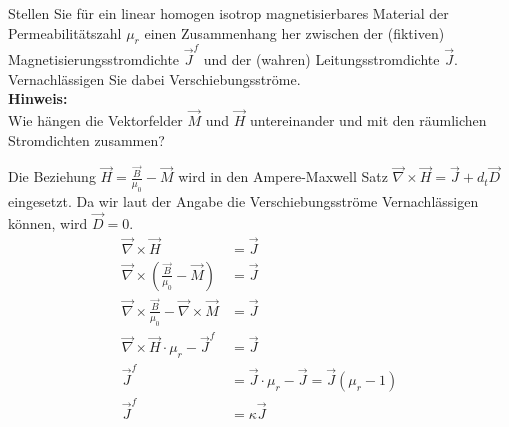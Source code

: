 \begin{question}[section=2,subsection=21,name={Wahre und fiktive Stromdichte},difficulty=2,type=bsp,mode=skp,tags={20161207}]
	Stellen Sie für ein linear homogen isotrop magnetisierbares Material der Permeabilitätszahl $\mu_r$ einen Zusammenhang her zwischen der (fiktiven) Magnetisierungsstromdichte $\vec J^f$ und der (wahren) Leitungsstromdichte $ \vec J$. Vernachlässigen Sie dabei Verschiebungsströme.
	\\ \textbf{Hinweis:}\\
	Wie hängen die Vektorfelder $\vec M$ und $\vec H$ untereinander und mit den räumlichen Stromdichten zusammen?
\end{question}
\begin{solution}
	Die Beziehung $\vec H = \frac{\vec B}{\mu_0} - \vec M$ wird in den Ampere-Maxwell Satz $\vec \nabla \times \vec H = \vec J + d_t \vec D$ eingesetzt. Da wir laut der Angabe die Verschiebungsströme Vernachlässigen können, wird $\vec D = 0$.
	\begin{align}
		\vec \nabla \times \vec H &= \vec J\\
		\vec \nabla \times ( \frac{\vec B}{\mu_0} - \vec M) &= \vec J\\
		\vec \nabla \times \frac{\vec B}{\mu_0} - \vec \nabla \times  \vec M &= \vec J\\
		\vec \nabla \times  \vec H \cdot \mu_r - \vec J^f &= \vec J\\
		\vec J^f &= \vec J \cdot \mu_r - \vec J = \vec J (\mu_r -1)\\
		\vec J^f &= \kappa \vec J
	\end{align}
\end{solution}